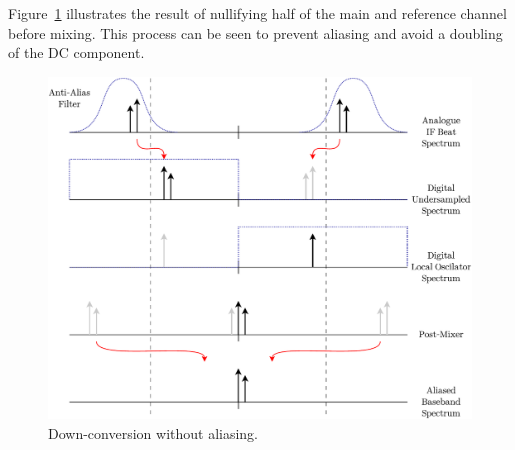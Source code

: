 \documentclass[a4paper,11pt]{report}
\begin{document}
Figure~\ref{fig:anti_alias_down_conversion} illustrates the result of nullifying half of the main and reference channel before mixing. This process can be seen to prevent aliasing and avoid a doubling of the DC component.
\begin{figure}[!ht]
    \begin{center}
        \includegraphics[width=\textwidth]{images/anti_alias_down_conversion}
        \caption{Down-conversion without aliasing.}
        \label{fig:anti_alias_down_conversion}
    \end{center}
\end{figure}
\end{document}
